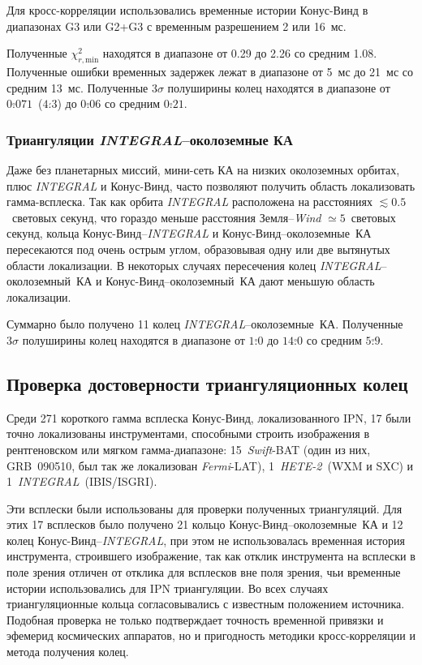 Для кросс-корреляции использовались временные истории Конус-Винд в диапазонах G3 
или G2+G3 с временным разрешением 2 или 16~мс.

Полученные $\chi^2_{r,\textrm{min}}$ находятся в диапазоне от 0.29 до 2.26 со 
средним 1.08. Полученные ошибки временных задержек лежат в диапазоне от 5~мс 
до 21~мс со средним 13~мс. Полученные $3\sigma$ полуширины колец находятся 
в диапазоне от $0\overset{\circ}{.}071$~($4\overset{\prime}{.}3$) до $0\overset{\circ}{.}06$ 
со средним $0\overset{\circ}{.}21$.

\subsubsection{Триангуляции \textit{INTEGRAL}--околоземные КА}
Даже без планетарных миссий, мини-сеть КА на низких околоземных орбитах, 
плюс \textit{INTEGRAL} и Конус-Винд, часто позволяют получить область локализовать 
гамма-всплеска. Так как орбита \textit{INTEGRAL} расположена на расстояниях 
$\lesssim 0.5$~световых секунд, что гораздо меньше расстояния Земля--\textit{Wind} 
$\simeq 5$~световых секунд, кольца Конус-Винд--\textit{INTEGRAL} и Конус-Винд--околоземные~КА 
пересекаются под очень острым углом, образовывая одну или две вытянутых области локализации. 
В некоторых случаях пересечения колец \textit{INTEGRAL}--околоземный~КА и 
Конус-Винд--околоземный~КА дают меньшую область локализации.

Суммарно было получено 11 колец \textit{INTEGRAL}--околоземные~КА. Полученные $3\sigma$ 
полуширины колец находятся в диапазоне от $1\overset{\circ}{.}0$ до $14\overset{\circ}{.}0$ 
со средним $5\overset{\circ}{.}9$.

\subsection{Проверка достоверности триангуляционных колец}
Среди 271 короткого гамма всплеска Конус-Винд, локализованного IPN, 17 были точно 
локализованы инструментами, способными строить изображения в рентгеновском или 
мягком гамма-диапазоне: 15~\textit{Swift}-BAT (один из них, GRB~090510, был 
так же локализован \textit{Fermi}-LAT), 1~\textit{HETE-2}~(WXM и SXC) и 1~\textit{INTEGRAL}~(IBIS/ISGRI).

Эти всплески были использованы для проверки полученных триангуляций. Для этих 17 всплесков 
было получено 21 кольцо Конус-Винд--околоземные~КА и 12 колец Конус-Винд--\textit{INTEGRAL}, 
при этом не использовалась временная история инструмента, строившего изображение, 
так как отклик инструмента на всплески в поле зрения отличен от отклика для всплесков 
вне поля зрения, чьи временные истории использовались для IPN триангуляции. 
Во всех случаях триангуляционные кольца согласовывались с известным положением источника. 
Подобная проверка не только подтверждает точность временной привязки и эфемерид космических
аппаратов, но и пригодность методики кросс-корреляции и метода получения колец.

